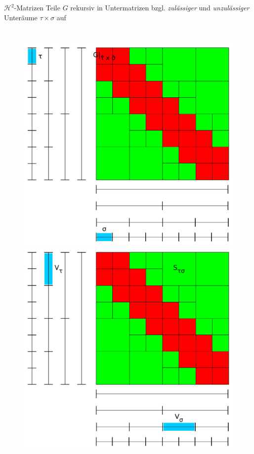 \documentclass[10pt]{beamer}
\begin{document}
\begin{frame}{\(\mathcal{H}^2\)-Matrizen}
  Teile \( G \) rekursiv in Untermatrizen bzgl. \textit{zulässiger} und
  \textit{unzulässiger} Unteräume \( \tau \times \sigma \) auf

  \begin{columns}
      \begin{figure}
        \begin{overprint}
          \centering\includegraphics[width=\linewidth]{figures/fg-h2-matrix-4.pdf}
          \centering\includegraphics[width=\linewidth]{figures/fg-h2-matrix-5.pdf}

\end{overprint}
\end{figure}
\end{columns}
\end{frame}
\end{document}
